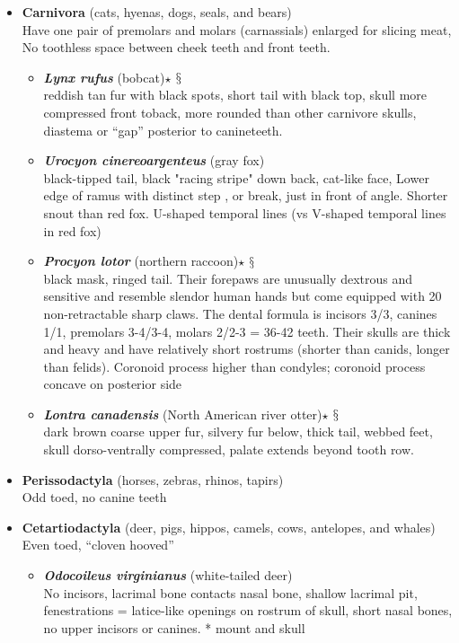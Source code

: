 \documentclass[a4paper,12pt]{article}
\begin{document}
\begin{description}
\begin{itemize}
\begin{itemize}
\begin{itemize}
    \end{itemize}
    \item{\textbf{Carnivora} (cats, hyenas, dogs, seals, and bears)} \\ Have one pair of premolars and molars (carnassials) enlarged for slicing meat, No toothless space between cheek teeth and front teeth.
    \begin{itemize}
      \item{\textbf{\textit{Lynx rufus}} (bobcat)$\star$ $\mathsection$} \\ reddish tan fur with black spots, short tail with black top, skull more compressed front toback, more rounded than other carnivore skulls, diastema or “gap” posterior to canineteeth.
      \item{\textbf{\textit{Urocyon cinereoargenteus}} (gray fox)} \\ black-tipped tail, black "racing stripe" down back, cat-like face, Lower edge of ramus with distinct step , or break, just in front of angle. Shorter snout than red fox. U-shaped temporal lines (vs V-shaped temporal lines in red fox) 
      \item{\textbf{\textit{Procyon lotor}} (northern raccoon)$\star$ $\mathsection$} \\ black mask, ringed tail. Their forepaws are unusually dextrous and sensitive and resemble slendor human hands but come equipped with 20 non-retractable sharp claws. The dental formula is incisors 3/3, canines 1/1, premolars 3-4/3-4, molars 2/2-3 = 36-42 teeth. Their skulls are thick and heavy and have relatively short rostrums (shorter than canids, longer than felids). Coronoid process higher than condyles; coronoid process concave on posterior side
      \item{\textbf{\textit{Lontra canadensis}} (North American river otter)$\star$ $\mathsection$} \\ dark brown coarse upper fur, silvery fur below, thick tail, webbed feet, skull dorso-ventrally compressed, palate extends beyond tooth row.
    \end{itemize}
    \item{\textbf{Perissodactyla} (horses, zebras, rhinos, tapirs)} \\ Odd toed, no canine teeth
    \item{\textbf{Cetartiodactyla} (deer, pigs, hippos, camels, cows, antelopes, and whales)} \\ Even toed, “cloven hooved”
    \begin{itemize}
      \item{\textbf{\textit{Odocoileus virginianus}} (white-tailed deer)} \\ No incisors, lacrimal bone contacts nasal bone, shallow lacrimal pit, fenestrations = latice-like openings on rostrum of skull, short nasal bones, no upper incisors or canines. * mount and skull

\end{itemize}
\end{itemize}
\end{itemize}
\end{description}
\end{document}
